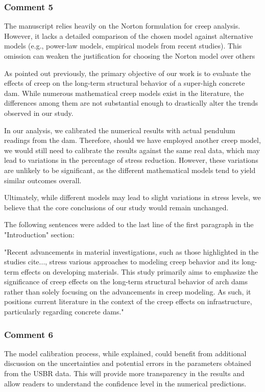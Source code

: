 \documentclass{ar2rc}
\begin{document}
{	\subsubsection{Comment 5}
	\RC	The manuscript relies heavily on the Norton formulation for creep analysis. However, it lacks	a detailed comparison of the chosen model against alternative models (e.g., power-law models, empirical models from recent studies). This omission can weaken the justification for	choosing the Norton model over others
	
	\AR As pointed out previously, the primary objective of our work is to evaluate the effects of creep on the long-term structural behavior of a super-high concrete dam. While numerous mathematical creep models exist in the literature, the differences among them are not substantial enough to drastically alter the trends observed in our study.
	
	In our analysis, we calibrated the numerical results with actual pendulum readings from the dam. Therefore, should we have employed another creep model, we would still need to calibrate the results against the same real data, which may lead to variations in the percentage of stress reduction. However, these variations are unlikely to be significant, as the different mathematical models tend to yield similar outcomes overall.
	
	Ultimately, while different models may lead to slight variations in stress levels, we believe that the core conclusions of our study would remain unchanged.
	
	The following sentences were added to the last line of the first paragraph in the "Introduction" section:
	
	"Recent advancements in material investigations, such as those highlighted in the studies cite{...}, stress various approaches to modeling creep behavior and its long-term effects on developing materials. This study primarily aims to emphasize the significance of creep effects on the long-term structural behavior of arch dams rather than solely focusing on the advancements in creep modeling. As such, it positions current literature in the context of the creep effects on infrastructure, particularly regarding concrete dams."
	
	
	\subsubsection{Comment 6}
	\RC	The model calibration process, while explained, could benefit from additional discussion on the uncertainties and potential errors in the parameters obtained from the USBR data. This will provide more transparency in the results and allow readers to understand the confidence level in the numerical predictions.
	
}
\end{document}
